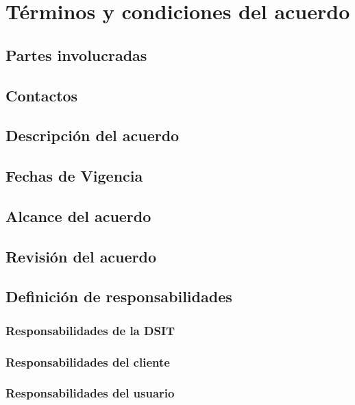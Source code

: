 
\section{T\'erminos y condiciones del acuerdo}
\subsection{Partes involucradas}

\subsection{Contactos}

\subsection{Descripci\'on del acuerdo}

\subsection{Fechas de Vigencia}

\subsection{Alcance del acuerdo}

\subsection{Revisi\'on del acuerdo}

\subsection{Definici\'on de responsabilidades}
\subsubsection{Responsabilidades de la DSIT}
\subsubsection{Responsabilidades del cliente}
\subsubsection{Responsabilidades del usuario}


